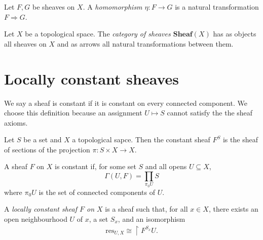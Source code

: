 \documentclass{article}
\begin{document}
\begin{definition}
  Let $F,G$ be sheaves on $X$. A \emph{homomorphism $\eta:F\to G$} is
  a natural transformation $F\Rightarrow G$.
\end{definition}

\begin{definition}
  Let $X$ be a topological space. The \emph{category of sheaves $\textbf{Sheaf}(X)$}
  has as objects all sheaves on $X$ and as arrows all natural transformations between
  them.
\end{definition}

\section{Locally constant sheaves}\label{sec:locally_constant_sheaves}

We say a sheaf is constant if it is constant on every connected component. We choose this
definition because an assignment $U\mapsto S$ cannot satisfy the the sheaf axioms.

\begin{definition}
  Let $S$ be a set and $X$ a topological sapce. Then
  the constant sheaf $F^S$ is the sheaf of sections
  of the projection $\pi:S\times X\to X$.
\end{definition}


\begin{definition}
  A sheaf $F$ on $X$ is constant if, for some set $S$ and all opens $U\subseteq X$,
  \begin{equation}
    \Gamma(U,F) = \prod_{\pi_0U}S
  \end{equation}
  where $\pi_0U$ is the set of connected components of $U$.
\end{definition}

\begin{definition}
  A \emph{locally constant sheaf $F$ on $X$} is a sheaf such that,
  for all $x\in X$, there exists an open neighbourhood $U$ of $x$,
  a set $S_x$, and an isomorphism
  \begin{align*}
    \text{res}_{U,X} \cong \restriction{F^{S_x}}{U}.
  \end{align*}
\end{definition}
\end{document}
